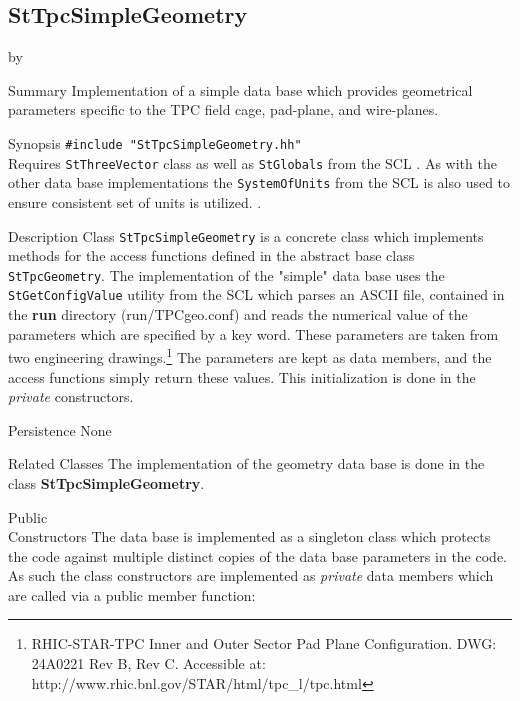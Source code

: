 \documentclass[twoside]{article}
\newcommand{\comp}[1]{\texttt{#1}}%
\newcommand{\entrylabel}[1]{\mbox{\textbf{{#1}}}\hfil}%
\newenvironment{entry}
{\begin{list}{}%
    {\renewcommand{\makelabel}{\entrylabel}%
     \setlength{\labelwidth}{90pt}%
     \setlength{\leftmargin}{\labelwidth}
     \advance\leftmargin by \labelsep%
      }%
    }%
  {\end{list}}
\newcommand{\Entrylabel}[1]%
{\raisebox{0pt}[1ex][0pt]{\makebox[\labelwidth][l]%
    {\parbox[t]{\labelwidth}{\hspace{0pt}\textbf{{#1}}}}}}
\newenvironment{Entry}%
{\renewcommand{\entrylabel}{\Entrylabel}\begin{entry}}%
  {\end{entry}}
\begin{document}
\subsection{StTpcSimpleGeometry }
\begin{Entry}
\item[Summary]
    Implementation of a simple data base which provides geometrical
    parameters specific to the TPC field cage, pad-plane, and 
    wire-planes.
    
\item[Synopsis]
    \verb+#include "StTpcSimpleGeometry.hh"+\\
    Requires \comp{StThreeVector} class as well as \comp{StGlobals}
    from the SCL .  As with the other data base implementations
    the \comp{SystemOfUnits} from the SCL is also used to ensure consistent
    set of units is utilized. .

\item[Description]  
Class \comp{StTpcSimpleGeometry} is a concrete class which implements
methods for the access functions defined in the abstract base 
class \comp{StTpcGeometry}.   The implementation of the "simple" data base 
uses the \comp{StGetConfigValue}
utility from the SCL which parses an ASCII file, contained in
the {\bf run} directory (run/TPCgeo.conf) and reads the
numerical value of the parameters which are specified by a key word.  
These parameters are taken from two engineering
drawings.\footnote{RHIC-STAR-TPC Inner and Outer Sector
  Pad Plane Configuration. DWG: 24A0221 Rev B, Rev C.  Accessible at:
  http://www.rhic.bnl.gov/STAR/html/tpc\_l/tpc.html}
The parameters are kept as data members, and the access functions
simply return these values.  This initialization is done in the
{\em private} constructors.

\item[Persistence]
   None

\item[Related Classes]
    The implementation of the geometry data base is done in
    the class {\bf StTpcSimpleGeometry}. 
  
\item[Public \\ Constructors]
   The  data base is implemented as a singleton class 
   which protects the code against multiple distinct copies of the
   data base parameters in the code.  As such the class constructors
   are implemented as {\em private} data members which are called
   via a public member function:


\end{Entry}
\end{document}
